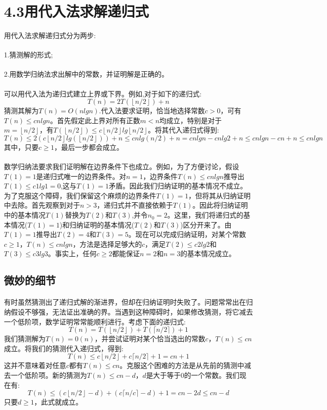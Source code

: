 \documentclass[a4paper,11pt]{article}
\newcommand{\floor}[1]{\left\lfloor #1 \right\rfloor}
\newcommand{\ceiling}[1]{\lceil #1 \rceil}
\begin{document}
\section*{4.3用代入法求解递归式}
\paragraph*{}用代入法求解递归式分为两步:
\paragraph*{}1.猜测解的形式;
\paragraph*{}2.用数学归纳法求出解中的常数，并证明解是正确的。
\paragraph*{}可以用代入法为递归式建立上界或下界。例如,对于如下的递归式:
\[
	T(n) = 2T(\floor{n/2})+n
\]
猜测其解为$T(n)=O(nlgn)$.代入法要求证明，恰当地选择常数$c>0$，可有$T(n) \leq cnlgn$。首先假定此上界对所有正数$m<n$均成立，特别是对于$m=\floor{n/2}$，有$T(\floor{n/2}) \leq c\floor{n/2}lg{\floor{n/2}}$。将其代入递归式得到:
\[
	T(n)\leq 2(c\floor{n/2}lg(\floor{n/2}))+n\leq cnlg(n/2)+n=cnlgn-cnlg2+n\leq cnlgn-cn+n \leq cnlgn
\]
其中，只要$c\geq 1$，最后一步都会成立。
\paragraph*{}数学归纳法要求我们证明解在边界条件下也成立。例如，为了方便讨论，假设$T(1)=1$是递归式唯一的边界条件。对$n=1$，边界条件$T(n)\leq cnlgn$推导出$T(1)\leq c1lg1=0$,这与$T(1)=1$矛盾。因此我们归纳证明的基本情况不成立。为了克服这个障碍，我们保留这个麻烦的边界条件$T(1)=1$，但将其从归纳证明中去除。首先观察到对于$n>3$，递归式并不直接依赖于$T(1)$。因此将归纳证明中的基本情况$T(1)$替换为$T(2)$和$T(3)$,并令$n_0=2$。这里，我们将递归式的基本情况($T(1)=1$)和归纳证明的基本情况($T(2)$和$T(3)$)区分开来了。由$T(1)=1$推导出$T(2)=4$和$T(3)=5$。现在可以完成归纳证明，对某个常数$c\geq 1$，$T(n)\leq cnlgn$，方法是选择足够大的$c$，满足$T(2)\leq c2lg2$和$T(3)\leq c3lg3$。事实上，任何$c\geq 2$都能保证$n=2$和$n=3$的基本情况成立。
\subsection*{微妙的细节}
\paragraph*{}有时虽然猜测出了递归式解的渐进界，但却在归纳证明时失败了。问题常常出在归纳假设不够强，无法证出准确的界。当遇到这种障碍时，如果修改猜测，将它减去一个低阶项，数学证明常常能顺利进行。考虑下面的递归式:
\[
	T(n)=T(\floor{n/2})+T(\ceiling{n/2})+1
\]
我们猜测解为$T(n)=0(n)$，并尝试证明对某个恰当选出的常数$c$，$T(n)\leq cn$成立。将我们的猜测代入递归式，得到:
\[
	T(n)\leq c\floor{n/2}+c\ceiling{n/2}+1=cn+1
\]
这并不意味着对任意$c$都有$T(n)\leq cn$。克服这个困难的方法是从先前的猜测中减去一个低阶项。新的猜测为$T(n)\leq cn-d$，$d$是大于等于0的一个常数。我们现在有:
\[
	T(n)\leq (c\floor{n/2}-d)+(c\ceiling{n/c}-d)+1=cn-2d\leq cn-d
\]
只要$d\geq 1$，此式就成立。
\end{document}
